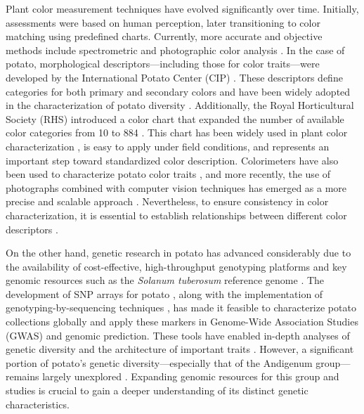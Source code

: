 \documentclass[pdflatex,sn-mathphys-ay]{sn-jnl}%
\begin{document}
Plant color measurement techniques have evolved significantly over time. Initially, assessments were based on human perception, later transitioning to color matching using predefined charts. Currently, more accurate and objective methods include spectrometric and photographic color analysis \citep{kasajima2019measuring}. In the case of potato, morphological descriptors—including those for color traits—were developed by the International Potato Center (CIP) \citep{huaman1977descriptors,gomez2000guia}. These descriptors define categories for both primary and secondary colors and have been widely adopted in the characterization of potato diversity \citep{behn2023phenolic,Berdugo2017,larico2024descripcion}. Additionally, the Royal Horticultural Society (RHS) introduced a color chart that expanded the number of available color categories from 10 to 884 \citep{RHS2015}. This chart has been widely used in plant color characterization \citep{tang2014effects}, is easy to apply under field conditions, and represents an important step toward standardized color description. Colorimeters have also been used to characterize potato color traits \citep{thornton2013influence}, and more recently, the use of photographs combined with computer vision techniques has emerged as a more precise and scalable approach \citep{miller2023tubar,yusuf2024genomic,azizi2016identifying,ropelewska2021effect,feldman2024}. Nevertheless, to ensure consistency in color characterization, it is essential to establish relationships between different color descriptors \citep{voss1992relating,ayala2006evaluation}. 

On the other hand, genetic research in potato has advanced considerably due to the availability of cost-effective, high-throughput genotyping platforms and key genomic resources such as the \textit{Solanum tuberosum} reference genome \citep{xu2011genome,Pham2020}. The development of SNP arrays for potato \citep{felcher2012integration, vos2015development}, along with the implementation of genotyping-by-sequencing techniques \citep{sharma2024genotyping}, has made it feasible to characterize potato collections globally and apply these markers in Genome-Wide Association Studies (GWAS) and genomic prediction. These tools have enabled in-depth analyses of genetic diversity and the architecture of important traits \citep{sharma2024genotyping, pandey2021genetic}. However, a significant portion of potato’s genetic diversity—especially that of the Andigenum group—remains largely unexplored \citep{ghislain2020genes}. Expanding genomic resources for this group and studies is crucial to gain a deeper understanding of its distinct genetic characteristics.
\end{document}
